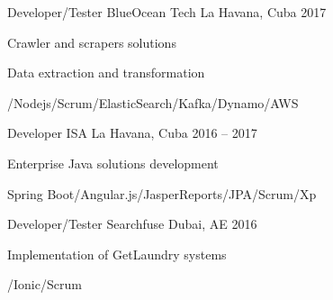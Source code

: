 


\begin{cventries}


\cventry
{Developer/Tester} %
{BlueOcean Tech} %
{La Havana, Cuba} %
{2017} %
{ %
\begin{cvitems}
\item {Crawler and scrapers solutions}
\item {Data extraction and transformation}
\item {/Nodejs/Scrum/ElasticSearch/Kafka/Dynamo/AWS}
\end{cvitems}
}


\cventry
{Developer} %
{ISA} %
{La Havana, Cuba} %
{2016 – 2017} %
{ %
\begin{cvitems}
\item {Enterprise Java solutions development}
\item {Spring Boot/Angular.js/JasperReports/JPA/Scrum/Xp}
\end{cvitems}
}


\cventry
{Developer/Tester} %
{Searchfuse} %
{Dubai, AE} %
{2016} %
{ %
\begin{cvitems}
\item {Implementation of GetLaundry systems}
\item {/Ionic/Scrum}
\end{cvitems}
}



\end{cventries}
